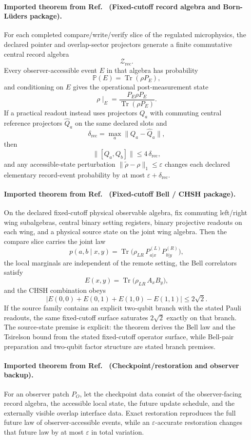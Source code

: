 \paragraph{Imported theorem from Ref.~\cite{ophmicrophysics} (Fixed-cutoff record algebra and Born-L\"uders package).}
For each completed compare/write/verify slice of the regulated microphysics, the declared pointer
and overlap-sector projectors generate a finite commutative central record algebra
\[
\mathcal Z_{\mathrm{rec}}.
\]
Every observer-accessible event \(E\) in that algebra has probability
\[
\mathbb P(E)=\operatorname{Tr}(\rho P_E),
\]
and conditioning on \(E\) gives the operational post-measurement state
\[
\rho\!\mid_E = \frac{P_E \rho P_E}{\operatorname{Tr}(\rho P_E)}.
\]
If a practical readout instead uses projectors \(Q_a\) with commuting central reference
projectors \(\widehat Q_a\) on the same declared slots and
\[
\delta_{\mathrm{rec}}=\max_a \|Q_a-\widehat Q_a\|,
\]
then
\[
\|[Q_a,Q_b]\|\le 4\,\delta_{\mathrm{rec}},
\]
and any accessible-state perturbation \(\|\widetilde\rho-\rho\|_1\le\varepsilon\) changes each
declared elementary record-event probability by at most \(\varepsilon+\delta_{\mathrm{rec}}\).

\paragraph{Imported theorem from Ref.~\cite{ophmicrophysics} (Fixed-cutoff Bell / CHSH package).}
On the declared fixed-cutoff physical observable algebra, fix commuting left/right wing
subalgebras, central binary setting registers, binary projective readouts on each wing, and a
physical source state on the joint wing algebra. Then the compare slice carries the joint law
\[
p(a,b\mid x,y)
=
\operatorname{Tr}\!\bigl(\rho_{LR}\,P_{a|x}^{(L)}P_{b|y}^{(R)}\bigr),
\]
the local marginals are independent of the remote setting, the Bell correlators satisfy
\[
E(x,y)=\operatorname{Tr}\!\bigl(\rho_{LR}\,A_xB_y\bigr),
\]
and the CHSH combination obeys
\[
\bigl|E(0,0)+E(0,1)+E(1,0)-E(1,1)\bigr|
\le
2\sqrt2.
\]
If the source family contains an explicit two-qubit branch with the stated Pauli readouts, the
same fixed-cutoff surface saturates \(2\sqrt2\) exactly on that branch. The source-state premise
is explicit: the theorem derives the Bell law and the Tsirelson bound from the stated
fixed-cutoff operator surface, while Bell-pair preparation and two-qubit factor structure are
stated branch premises.

\paragraph{Imported theorem from Ref.~\cite{ophmicrophysics} (Checkpoint/restoration and observer backup).}
For an observer patch \(P_O\), let the checkpoint data consist of the observer-facing record
algebra, the accessible local state, the future update schedule, and the externally visible
overlap interface data. Exact restoration reproduces the full future law of observer-accessible
events, while an \(\varepsilon\)-accurate restoration changes that future law by at most
\(\varepsilon\) in total variation.


